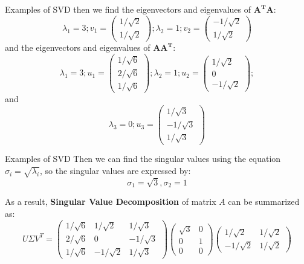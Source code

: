 \documentclass[10pt]{beamer}
\begin{document}
\begin{frame}[fragile]{Examples of SVD}
  then we find the eigenvectors and eigenvalues of $\mathbf{A^TA}$:
  $$\lambda_1= 3; v_1 = \left( \begin{array}{ccc} 1/\sqrt{2} \\ 1/\sqrt{2} \end{array} \right); \lambda_2= 1; v_2 = \left( \begin{array}{ccc} -1/\sqrt{2} \\ 1/\sqrt{2} \end{array} \right)$$
  and the eigenvectors and eigenvalues of $\mathbf{AA^T}$:
  $$\lambda_1= 3; u_1 = \left( \begin{array}{ccc} 1/\sqrt{6} \\ 2/\sqrt{6} \\ 1/\sqrt{6} \end{array} \right); \lambda_2= 1; u_2 = \left( \begin{array}{ccc} 1/\sqrt{2} \\ 0 \\ -1/\sqrt{2} \end{array} \right); $$
  and 
  $$\lambda_3= 0; u_3 = \left( \begin{array}{ccc} 1/\sqrt{3} \\ -1/\sqrt{3} \\ 1/\sqrt{3} \end{array} \right)$$

\end{frame}

\begin{frame}[fragile]{Examples of SVD}
  Then we can find the singular values using the equation $\sigma_i = \sqrt{\lambda_i}$, so the singular values are expressed by: $$\sigma_1 = \sqrt{3}, \sigma_2=1$$
  
  As a result, \textbf{Singular Value Decomposition} of matrix $A$ can be summarized as:
  $$U\Sigma V^T = \left( \begin{array}{ccc} 1/\sqrt{6} & 1/\sqrt{2} & 1/\sqrt{3} \\ 2/\sqrt{6} & 0 & -1/\sqrt{3}\\ 1/\sqrt{6} & -1/\sqrt{2} & 1/\sqrt{3} \end{array} \right) \left( \begin{array}{ccc} \sqrt{3} & 0 \\  0 & 1\\ 0 & 0 \end{array} \right) \left( \begin{array}{ccc} 1/\sqrt{2}  & 1/\sqrt{2}  \\ -1/\sqrt{2}  & 1/\sqrt{2}  \end{array} \right)$$
\end{frame}
\end{document}

